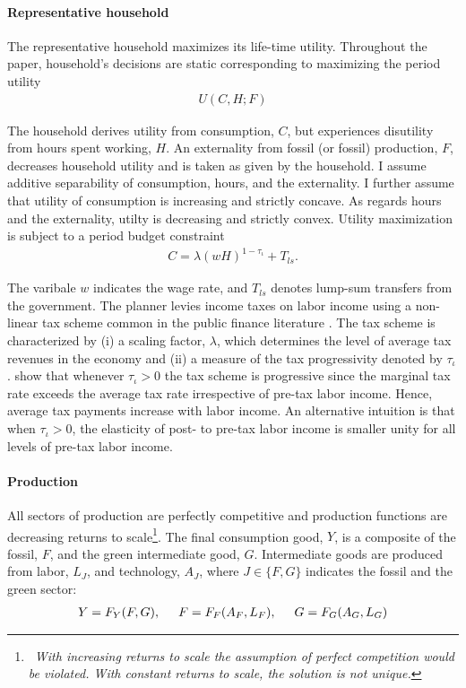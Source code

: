 \paragraph{Representative household}
The representative household maximizes its life-time utility. Throughout the paper, household's decisions are static corresponding to maximizing the period utility
\begin{align}
U(C,H; F)
\end{align} 

The household derives utility from consumption, $C$, but experiences disutility from hours spent working, $H$. An externality from fossil (or fossil) production, $F$, decreases household utility and is taken as given by the household.
I assume additive separability of consumption, hours, and the externality. I further assume that utility of consumption is increasing and strictly concave. As regards hours and the externality, utilty is decreasing and strictly convex.
Utility maximization is subject to a period budget constraint
\begin{align}
	 C= \lambda(wH)^{1-\tau_{\iota}}+T_{ls}. \label{eq:hhbudget}
\end{align}

The varibale $w$ indicates the wage rate, and $T_{ls}$ denotes lump-sum transfers from the government.
The planner levies income taxes on labor income using a non-linear tax scheme common in the public finance literature \citep{Heathcote2017OptimalFramework, Benabou2002TaxEfficiency}. The tax scheme is
characterized by (i) a scaling factor, $\lambda$, which determines the level of average tax revenues in the economy and (ii) a measure of the tax progressivity denoted by $\tau_{\iota}$. 
\cite{Heathcote2017OptimalFramework} show that whenever $\tau_{\iota}>0$ the tax scheme is progressive since the marginal tax rate exceeds the average tax rate irrespective of  pre-tax labor income. Hence, average tax payments increase with labor income. An alternative intuition is that when $\tau_{\iota}>0$, the elasticity of post- to pre-tax labor income is smaller unity for all levels of pre-tax labor income.  %

\paragraph{Production}
All sectors of production are perfectly competitive and production functions are decreasing returns to scale\footnote{\ \textit{With increasing returns to scale the assumption of perfect competition would be violated. With constant returns to scale, the solution is not unique.}}. The final consumption good, $Y$, is a composite of the fossil, $F$, and the green intermediate good, $G$. 
Intermediate goods are produced from labor, $L_J$, and technology, $A_J$, where $J\in \{F,G\}$ indicates the fossil and the green sector: 
\begin{align}
Y=F_Y(F, G), \hspace{5mm} F=F_F(A_F, L_F),\hspace{5mm} G=F_G(A_G, L_G) \label{eq:prod}
\end{align}

